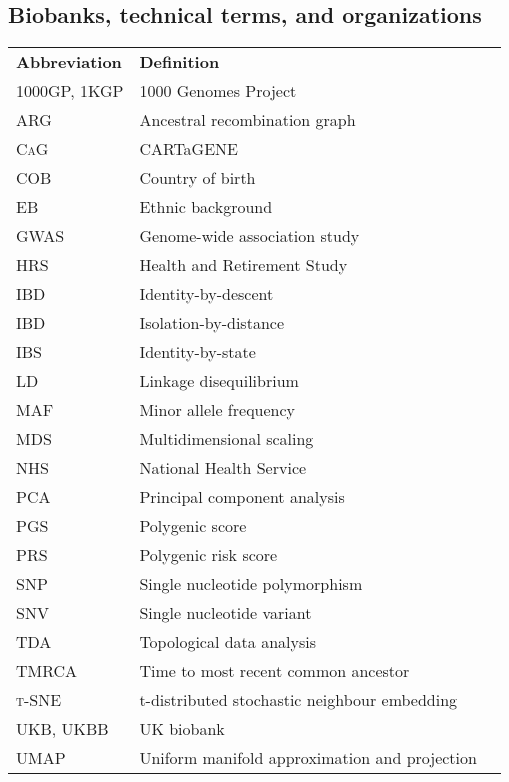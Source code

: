 
\subsection*{Biobanks, technical terms, and organizations}

\begin{table}[!h]
\hspace{1.0cm}
\begin{tabular}{l l r}

\textbf{Abbreviation} & \textbf{Definition} \\ [1ex]
\textsc{1000GP, 1KGP}  &  1000 Genomes Project \\ [1ex]
\textsc{ARG}  &  Ancestral recombination graph \\ [1ex]
\textsc{CaG}  &  CARTaGENE \\ [1ex]
\textsc{COB}  &  Country of birth \\ [1ex]
\textsc{EB}  &  Ethnic background \\ [1ex]
\textsc{GWAS}  &  Genome-wide association study \\ [1ex]
\textsc{HRS}  &  Health and Retirement Study \\ [1ex]
\textsc{IBD}  &  Identity-by-descent \\ [1ex]
\textsc{IBD}  &  Isolation-by-distance \\ [1ex]
\textsc{IBS}  &  Identity-by-state \\ [1ex]
\textsc{LD}  &  Linkage disequilibrium \\ [1ex]
\textsc{MAF}  &  Minor allele frequency \\ [1ex]
\textsc{MDS}  &  Multidimensional scaling \\ [1ex]
\textsc{NHS}  &  National Health Service \\ [1ex]
\textsc{PCA}  & Principal component analysis \\ [1ex]
\textsc{PGS}  &  Polygenic score \\ [1ex]
\textsc{PRS}  &  Polygenic risk score \\ [1ex]
\textsc{SNP}  &  Single nucleotide polymorphism \\ [1ex]
\textsc{SNV}  &  Single nucleotide variant \\ [1ex]
\textsc{TDA}  &  Topological data analysis \\ [1ex]
\textsc{TMRCA}  &  Time to most recent common ancestor \\ [1ex]
\textsc{{t}-SNE}  &  t-distributed stochastic neighbour embedding \\ [1ex]
\textsc{UKB, UKBB}  &  UK biobank \\ [1ex]
\textsc{UMAP}  &  Uniform manifold approximation and projection \\ [1ex]

\end{tabular}
\end{table}

